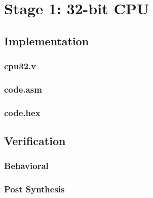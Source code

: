 \documentclass[11pt,letterpaper,final]{article}
\begin{document}
\pagebreak{}
\appendixpage
\appendix
\section{ Stage 1: 32-bit CPU }

\subsection{Implementation}
\subsubsection{cpu32.v}
\label{s1/cpu32.v}
\begin{scriptsize}
\end{scriptsize}
\subsubsection{code.asm}
\label{s1/code.asm}
\begin{scriptsize}
\end{scriptsize}
\subsubsection{code.hex}
\label{s1/code.hex}

\subsection{Verification}
\subsubsection{Behavioral}
\label{s1/behaviour}
\begin{scriptsize}
\end{scriptsize}
\subsubsection{Post Synthesis}
\label{s1/postsyn}
\begin{scriptsize}
\end{scriptsize}
\end{document}
